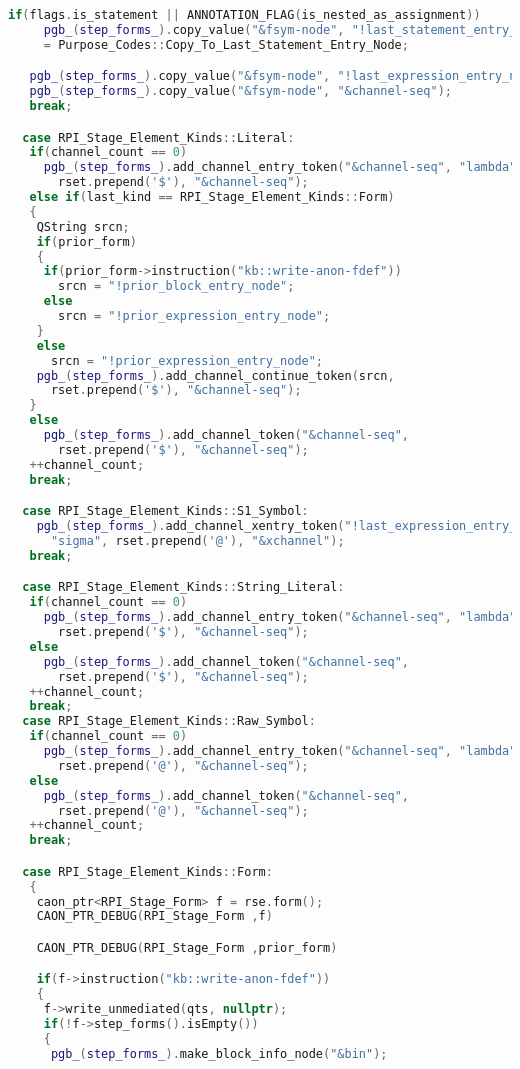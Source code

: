 \begin{lstlisting}[language = C++, numbers = none,
caption={Hypergraph IR Builder},label={lst:figPGB}, 
    basicstyle = \ttfamily\bfseries\scriptsize, linewidth = .9\linewidth]
   if(flags.is_statement || ANNOTATION_FLAG(is_nested_as_assignment))
     pgb_(step_forms_).copy_value("&fsym-node", "!last_statement_entry_node")
     = Purpose_Codes::Copy_To_Last_Statement_Entry_Node;

   pgb_(step_forms_).copy_value("&fsym-node", "!last_expression_entry_node");
   pgb_(step_forms_).copy_value("&fsym-node", "&channel-seq");
   break;

  case RPI_Stage_Element_Kinds::Literal:
   if(channel_count == 0)
     pgb_(step_forms_).add_channel_entry_token("&channel-seq", "lambda",
       rset.prepend('$'), "&channel-seq");
   else if(last_kind == RPI_Stage_Element_Kinds::Form)
   {
    QString srcn;
    if(prior_form)
    {
     if(prior_form->instruction("kb::write-anon-fdef"))
       srcn = "!prior_block_entry_node";
     else
       srcn = "!prior_expression_entry_node";
    }
    else
      srcn = "!prior_expression_entry_node";
    pgb_(step_forms_).add_channel_continue_token(srcn,
      rset.prepend('$'), "&channel-seq");
   }
   else
     pgb_(step_forms_).add_channel_token("&channel-seq",
       rset.prepend('$'), "&channel-seq");
   ++channel_count;
   break;

  case RPI_Stage_Element_Kinds::S1_Symbol:
    pgb_(step_forms_).add_channel_xentry_token("!last_expression_entry_node",
      "sigma", rset.prepend('@'), "&xchannel");
   break;

  case RPI_Stage_Element_Kinds::String_Literal:
   if(channel_count == 0)
     pgb_(step_forms_).add_channel_entry_token("&channel-seq", "lambda",
       rset.prepend('$'), "&channel-seq");
   else
     pgb_(step_forms_).add_channel_token("&channel-seq",
       rset.prepend('$'), "&channel-seq");
   ++channel_count;
   break;
  case RPI_Stage_Element_Kinds::Raw_Symbol:
   if(channel_count == 0)
     pgb_(step_forms_).add_channel_entry_token("&channel-seq", "lambda",
       rset.prepend('@'), "&channel-seq");
   else
     pgb_(step_forms_).add_channel_token("&channel-seq",
       rset.prepend('@'), "&channel-seq");
   ++channel_count;
   break;

  case RPI_Stage_Element_Kinds::Form:
   {
    caon_ptr<RPI_Stage_Form> f = rse.form();
    CAON_PTR_DEBUG(RPI_Stage_Form ,f)

    CAON_PTR_DEBUG(RPI_Stage_Form ,prior_form)

    if(f->instruction("kb::write-anon-fdef"))
    {
     f->write_unmediated(qts, nullptr);
     if(!f->step_forms().isEmpty())
     {
      pgb_(step_forms_).make_block_info_node("&bin");


\end{lstlisting}
